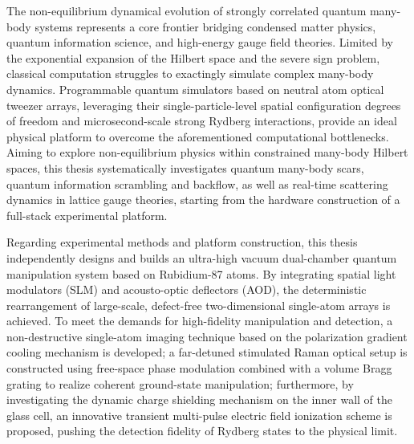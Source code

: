 \documentclass[type=doctor, anonymous=true]{hustthesis}
\begin{document}
\begin{abstract*}
The non-equilibrium dynamical evolution of strongly correlated quantum many-body systems represents a core frontier bridging condensed matter physics, quantum information science, and high-energy gauge field theories. Limited by the exponential expansion of the Hilbert space and the severe sign problem, classical computation struggles to exactingly simulate complex many-body dynamics. Programmable quantum simulators based on neutral atom optical tweezer arrays, leveraging their single-particle-level spatial configuration degrees of freedom and microsecond-scale strong Rydberg interactions, provide an ideal physical platform to overcome the aforementioned computational bottlenecks. Aiming to explore non-equilibrium physics within constrained many-body Hilbert spaces, this thesis systematically investigates quantum many-body scars, quantum information scrambling and backflow, as well as real-time scattering dynamics in lattice gauge theories, starting from the hardware construction of a full-stack experimental platform.

Regarding experimental methods and platform construction, this thesis independently designs and builds an ultra-high vacuum dual-chamber quantum manipulation system based on Rubidium-87 atoms. By integrating spatial light modulators (SLM) and acousto-optic deflectors (AOD), the deterministic rearrangement of large-scale, defect-free two-dimensional single-atom arrays is achieved. To meet the demands for high-fidelity manipulation and detection, a non-destructive single-atom imaging technique based on the polarization gradient cooling mechanism is developed; a far-detuned stimulated Raman optical setup is constructed using free-space phase modulation combined with a volume Bragg grating to realize coherent ground-state manipulation; furthermore, by investigating the dynamic charge shielding mechanism on the inner wall of the glass cell, an innovative transient multi-pulse electric field ionization scheme is proposed, pushing the detection fidelity of Rydberg states to the physical limit.


\end{abstract*}
\end{document}
